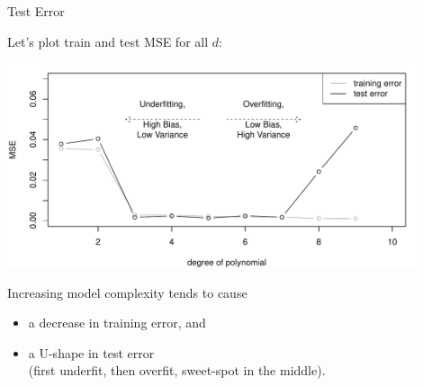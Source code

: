 \documentclass[11pt,compress,t,notes=noshow, xcolor=table]{beamer}
\begin{document}
\begin{vbframe}{Test Error}

Let's plot train and test MSE for all $d$:

\includegraphics[width=0.9\textwidth]{figure/eval_test_3} 

Increasing model complexity tends to cause

\begin{itemize}
  \item a decrease in training error, and\\
  \item a U-shape in test error\\ 
  (first underfit, then overfit, sweet-spot in the middle).
  \end{itemize}
  
\end{vbframe}

\end{document}
